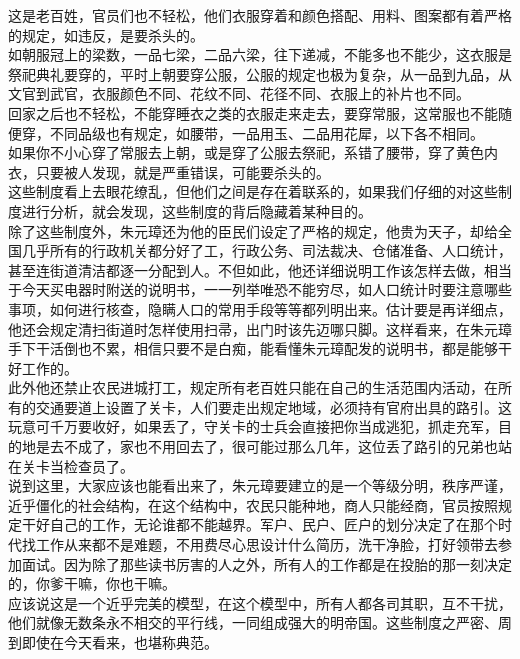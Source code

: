 \begin{multicols}{\theparacolNo}
这是老百姓，官员们也不轻松，他们衣服穿着和颜色搭配、用料、图案都有着严格的规定，如违反，是要杀头的。\\

如朝服冠上的梁数，一品七梁，二品六梁，往下递减，不能多也不能少，这衣服是祭祀典礼要穿的，平时上朝要穿公服，公服的规定也极为复杂，从一品到九品，从文官到武官，衣服颜色不同、花纹不同、花径不同、衣服上的补片也不同。\\

回家之后也不轻松，不能穿睡衣之类的衣服走来走去，要穿常服，这常服也不能随便穿，不同品级也有规定，如腰带，一品用玉、二品用花犀，以下各不相同。\\

如果你不小心穿了常服去上朝，或是穿了公服去祭祀，系错了腰带，穿了黄色内衣，只要被人发现，就是严重错误，可能要杀头的。\\

这些制度看上去眼花缭乱，但他们之间是存在着联系的，如果我们仔细的对这些制度进行分析，就会发现，这些制度的背后隐藏着某种目的。\\

除了这些制度外，朱元璋还为他的臣民们设定了严格的规定，他贵为天子，却给全国几乎所有的行政机关都分好了工，行政公务、司法裁决、仓储准备、人口统计，甚至连街道清洁都逐一分配到人。不但如此，他还详细说明工作该怎样去做，相当于今天买电器时附送的说明书，一一列举唯恐不能穷尽，如人口统计时要注意哪些事项，如何进行核查，隐瞒人口的常用手段等等都列明出来。估计要是再详细点，他还会规定清扫街道时怎样使用扫帚，出门时该先迈哪只脚。这样看来，在朱元璋手下干活倒也不累，相信只要不是白痴，能看懂朱元璋配发的说明书，都是能够干好工作的。\\

此外他还禁止农民进城打工，规定所有老百姓只能在自己的生活范围内活动，在所有的交通要道上设置了关卡，人们要走出规定地域，必须持有官府出具的路引。这玩意可千万要收好，如果丢了，守关卡的士兵会直接把你当成逃犯，抓走充军，目的地是去不成了，家也不用回去了，很可能过那么几年，这位丢了路引的兄弟也站在关卡当检查员了。\\

说到这里，大家应该也能看出来了，朱元璋要建立的是一个等级分明，秩序严谨，近乎僵化的社会结构，在这个结构中，农民只能种地，商人只能经商，官员按照规定干好自己的工作，无论谁都不能越界。军户、民户、匠户的划分决定了在那个时代找工作从来都不是难题，不用费尽心思设计什么简历，洗干净脸，打好领带去参加面试。因为除了那些读书厉害的人之外，所有人的工作都是在投胎的那一刻决定的，你爹干嘛，你也干嘛。\\

应该说这是一个近乎完美的模型，在这个模型中，所有人都各司其职，互不干扰，他们就像无数条永不相交的平行线，一同组成强大的明帝国。这些制度之严密、周到即使在今天看来，也堪称典范。\\


\end{multicols}

